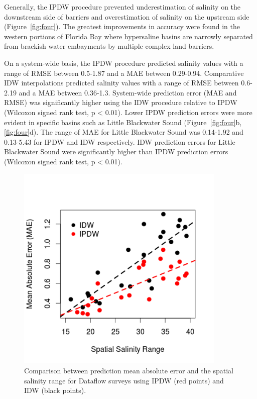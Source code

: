 \documentclass[shortnames,nofooter,noheadings]{jss}
\begin{document}
\noindent Generally, the IPDW procedure prevented underestimation of salinity on the downstream side of barriers and overestimation of salinity on the upstream side (Figure~\ref{fig:four}). The greatest improvements in accuracy were found in the western portions of Florida Bay where hypersaline basins are narrowly separated from brackish water embayments by multiple complex land barriers.   

  On a system-wide basis, the IPDW procedure predicted salinity values with a range of RMSE between 0.5-1.87 and a MAE between 0.29-0.94. Comparative IDW interpolations predicted salinity values with a range of RMSE between 0.6-2.19 and a MAE between 0.36-1.3.  System-wide prediction error (MAE and RMSE) was significantly higher using the IDW procedure relative to IPDW (Wilcoxon signed rank test, p < 0.01).  Lower IPDW prediction errors were more evident in specific basins such as Little Blackwater Sound (Figure~\ref{fig:four}b, \ref{fig:four}d). The range of MAE for Little Blackwater Sound was 0.14-1.92 and 0.13-5.43 for IPDW and IDW respectively. IDW prediction errors for Little Blackwater Sound were significantly higher than IPDW prediction errors (Wilcoxon signed rank test, p < 0.01).

\begin{figure}[h]
\begin{center}
\includegraphics[width=100mm]{sm-figure4.png}
\end{center}
\vspace{-20pt}
\caption{Comparison between prediction mean absolute error and the spatial salinity range for Dataflow surveys using IPDW (red points) and IDW (black points).}
\label{fig:five}
\end{figure}
\FloatBarrier
\end{document}
